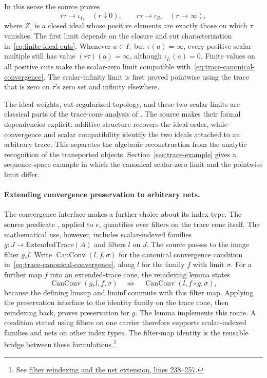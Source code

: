 In this sense the source proves
\begin{equation}
  r\tau\longrightarrow\iota_{I_\tau}\quad(r\downarrow0),
  \qquad
  r\tau\longrightarrow\iota_{Z_\tau}\quad(r\to\infty),
  \label{eq:trace-scalar-limits}
\end{equation}
where $Z_\tau$ is a closed ideal whose positive elements are exactly those
on which $\tau$ vanishes. The first limit depends on the closure and cut
characterization in~\eqref{eq:finite-ideal-cuts}. Whenever
$a\in I_\tau$ but $\tau(a)=\infty$, every positive scalar multiple
still has value $(r\tau)(a)=\infty$, although
$\iota_{I_\tau}(a)=0$. Finite values on all positive cuts make the scalar-zero limit compatible with~\eqref{eq:trace-canonical-convergence}. The scalar-infinity limit is first proved pointwise using the trace that is zero on $\tau$'s zero set and infinity elsewhere.

The ideal weights, cut-regularized topology, and these two scalar limits
are classical parts of the trace-cone analysis of
\citet[Sections~3.1--3.2]{ElliottRobertSantiago2011}. The source makes their
formal dependencies explicit: additive structure recovers the ideal
order, while convergence and scalar compatibility identify the two
ideals attached to an arbitrary trace. This separates the algebraic reconstruction from the analytic recognition of the transported objects. Section~\ref{sec:trace-example}
gives a sequence-space example in which the canonical scalar-zero limit
and the pointwise limit differ.

\paragraph{Extending convergence preservation to arbitrary nets.}
The convergence interface makes a further choice about its index type.
The source predicate , applied to $e$,
quantifies over filters on the
trace cone itself. The mathematical use, however, includes scalar-indexed
families $g:J\to\mathrm{ExtendedTrace}(A)$ and filters $l$ on $J$.
The source passes to the image filter $g_*l$. Write
$\operatorname{CanConv}(l,f,\sigma)$ for the canonical convergence
condition in~\eqref{eq:trace-canonical-convergence}, along $l$ for the
family $f$ with limit $\sigma$. For a further map $f$ into an
extended-trace cone, the reindexing lemma states
\[
 \operatorname{CanConv}(g_*l,f,\sigma)
 \quad\Longleftrightarrow\quad
 \operatorname{CanConv}(l,f\circ g,\sigma),
\]
because the defining limsup and liminf commute with this filter map.
Applying the preservation interface to the identity family on the trace
cone, then reindexing back, proves preservation for $g$.
The lemma  implements this route.
A condition stated using filters on one carrier therefore supports scalar-indexed families and nets on other index types. The filter-map identity is the reusable bridge between these formulations.\footnote{See
\href{https://github.com/openai/math/blob/fd4aeeb2ee4fc729c18d98444fed42fd0529eeeb/lean/OAI/Analysis/TraceCone/IdealTransport.lean\#L238-L257}{filter reindexing and the net extension, lines 238--257}.}

